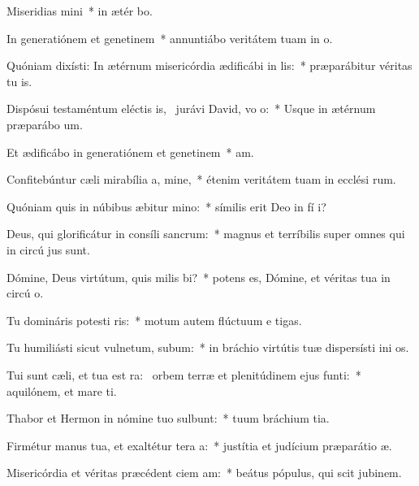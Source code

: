 \item Miseridias mini~* in ætér bo.
\item In generatiónem et genetinem~* annuntiábo veritátem tuam in  o.
\item Quóniam dixísti: In ætérnum misericórdia ædificábi in lis:~* præparábitur véritas tu  is.
\item Dispósui testaméntum eléctis is,~\pscross{} jurávi David, vo o:~* Usque in ætérnum præparábo  um.
\item Et ædificábo in generatiónem et genetinem~*  am.
\item Confitebúntur cæli mirabília a, mine,~* étenim veritátem tuam in ecclési rum.
\item Quóniam quis in núbibus æbitur mino:~* símilis erit Deo in fí i?
\item Deus, qui glorificátur in consíli sancrum:~* magnus et terríbilis super omnes qui in circú jus sunt.
\item Dómine, Deus virtútum, quis milis bi?~* potens es, Dómine, et véritas tua in circú o.
\item Tu domináris potesti ris:~* motum autem flúctuum e  tigas.
\item Tu humiliásti sicut vulnetum, subum:~* in bráchio virtútis tuæ dispersísti ini os.
\item Tui sunt cæli, et tua est ra:~\pscross{} orbem terræ et plenitúdinem ejus  funti:~* aquilónem, et mare  ti.
\item Thabor et Hermon in nómine tuo sulbunt:~* tuum bráchium  tia.
\item Firmétur manus tua, et exaltétur tera a:~* justítia et judícium præparátio  æ.
\item Misericórdia et véritas præcédent ciem am:~* beátus pópulus, qui scit jubinem.
